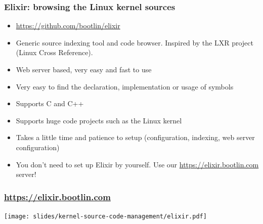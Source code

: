 \begin{frame}
  \frametitle{Elixir: browsing the Linux kernel sources}
  \begin{itemize}
  \item \url{https://github.com/bootlin/elixir}
  \item Generic source indexing tool and code browser.
        Inspired by the LXR project (Linux Cross Reference).
  \item Web server based, very easy and fast to use
  \item Very easy to find the declaration, implementation or usage
    of symbols
  \item Supports C and C++
  \item Supports huge code projects such as the Linux kernel
  \item Takes a little time and patience to setup (configuration,
    indexing, web server configuration)
  \item You don't need to set up Elixir by yourself. Use our
    \url{https://elixir.bootlin.com} server!
  \end{itemize}
\end{frame}

\begin{frame}
  \frametitle{\url{https://elixir.bootlin.com}}
  \begin{center}
    \texttt{[image: slides/kernel-source-code-management/elixir.pdf]}
  \end{center}
\end{frame}
